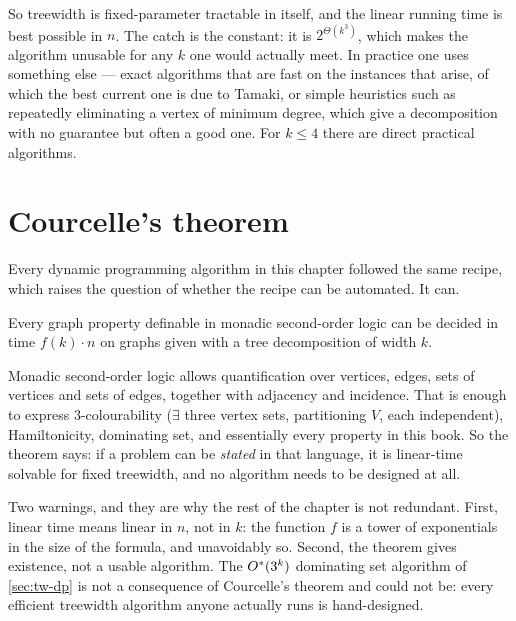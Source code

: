 So treewidth is fixed-parameter tractable in itself, and the linear running
time is best possible in $n$. The catch is the constant: it is
$2^{\Theta(k^3)}$, which makes the algorithm unusable for any $k$ one would
actually meet. In practice one uses something else --- exact algorithms that are
fast on the instances that arise, of which the best current one is due to
Tamaki, or simple heuristics such as repeatedly eliminating a vertex of minimum
degree, which give a decomposition with no guarantee but often a good one. For
$k \le 4$ there are direct practical algorithms.

\section{Courcelle's theorem}
\label{sec:courcelle}

Every dynamic programming algorithm in this chapter followed the same recipe,
which raises the question of whether the recipe can be automated. It can.

\begin{theorem}\label{thm:courcelle}
Every graph property definable in monadic second-order logic can be decided in
time $f(k) \cdot n$ on graphs given with a tree decomposition of width $k$.
\end{theorem}

Monadic second-order logic allows quantification over vertices, edges, sets of
vertices and sets of edges, together with adjacency and incidence. That is
enough to express $3$-colourability ($\exists$ three vertex sets, partitioning
$V$, each independent), Hamiltonicity, dominating set, and essentially every
property in this book. So the theorem says: if a problem can be \emph{stated}
in that language, it is linear-time solvable for fixed treewidth, and no
algorithm needs to be designed at all.

Two warnings, and they are why the rest of the chapter is not redundant. First,
linear time means linear in $n$, not in $k$: the function $f$ is a tower of
exponentials in the size of the formula, and unavoidably so. Second, the
theorem gives existence, not a usable algorithm. The
$O^{*}(3^k)$ dominating set algorithm of \cref{sec:tw-dp} is not a consequence
of Courcelle's theorem and
could not be: every efficient treewidth algorithm anyone actually runs is
hand-designed.


